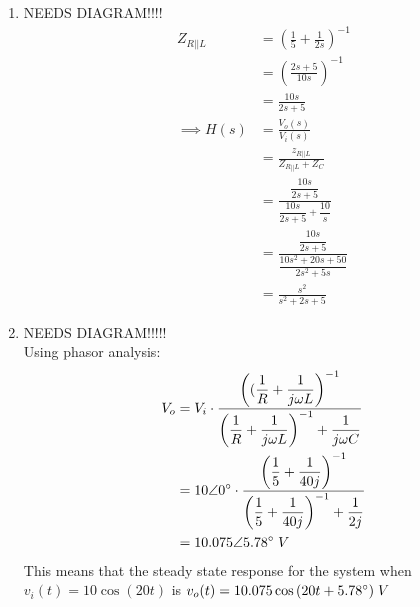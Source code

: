 \begin{enumerate}
	
	\item{
		NEEDS DIAGRAM!!!!\\
		\begin{align*}
		Z_{R||L} &= (\frac{1}{5} + \frac{1}{2s})^{-1}\\
		&= (\frac{2s+5}{10s})^{-1}\\
		&= \frac{10s}{2s+5}\\
		\implies H(s) &= \frac{V_o(s)}{V_i(s)}\\
		&= \frac{z_{R||L}}{Z_{R||L} + Z_C}\\
		&= \frac{\dfrac{10s}{2s+5}}{\dfrac{10s}{2s+5} + \dfrac{10}{s}}\\
		&= \frac{\dfrac{10s}{2s+5}}{\dfrac{10s^2+20s+50}{2s^2+5s}}\\
		&= \frac{s^2}{s^2+2s+5}
		\end{align*}
	}
	\item{
		NEEDS DIAGRAM!!!!!\\
		Using phasor analysis:
		\begin{align*}
		V_o &= V_i \cdot \frac{\left((\dfrac{1}{R} + \dfrac{1}
		{j \omega L}\right)^{-1}}{\left(\dfrac{1}{R} + \dfrac{1}
		{j \omega L}\right)^{-1} + \dfrac{1}{j \omega C}}\\
		&= 10 \angle 0\degree \cdot \frac{\left( \dfrac{1}{5} + 
		\dfrac{1}{40j} \right)^{-1}}{\left( \dfrac{1}{5} + 
		\dfrac{1}{40j} \right)^{-1} + \dfrac{1}{2j}}\\
		&= 10.075 \angle 5.78\degree \;V
		\end{align*}
		This means that the steady state response for the 
		system when $v_i(t) = 10\cos{(20t)}$ is $v_o(t) = 
		10.075 \cos{(20t + 5.78\degree)}\;V$
	}
\end{enumerate}